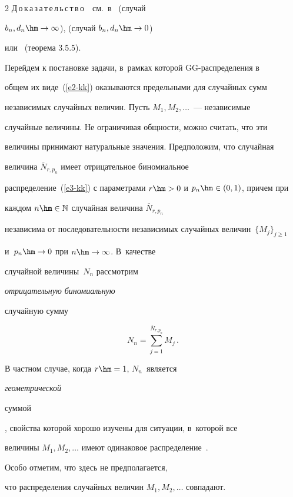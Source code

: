 \begin{multicols}{2}
Д\,о\,к\,а\,з\,а\,т\,е\,л\,ь\,с\,т\,в\,о\ \ см.~в~\cite{Korolev1994} (случай


$b_n,d_n\hm\to\infty$), \cite{Korolev1995} (случай $b_n,d_n\hm\to 0$) 


или~\cite{BeningKorolev2002} (теорема 3.5.5).





\smallskip





Перейдем к постановке задачи, в~рамках которой GG-распределения в


общем их виде~(\ref{e2-kk}) оказываются предельными для случайных сумм


независи\-мых случайных величин. Пусть $M_1,M_2,\ldots$~--- независимые


случайные величины. Не ограничивая общности, можно считать, что эти


величины принимают натуральные значения. Предположим, что случайная


величина $\overline N_{r,p_n}$ имеет отрицательное биномиальное


распределение~(\ref{e3-kk}) с параметрами $r\hm>0$ и $p_n\hm\in(0,1)$, причем при


каж\-дом $n\hm\in\mathbb{N}$ случайная величина $\overline N_{r,p_n}$


независима от последовательности независимых случайных величин~$\{M_j\}_{j\geqslant1}$ 


и~$p_n\hm\to 0$ при $n\hm\to\infty$. В~качестве


случайной величины~$N_n$ рассмотрим {\it отрицательную биномиальную


случайную сумму}


\begin{equation}


N_n=\sum\limits_{j=1}^{\overline N_{r,p_n}}M_j\,.\label{e16-kk}


\end{equation}


В частном случае, когда $r\hm=1$, $N_n$~является {\it геометрической


суммой}, свойства которой хорошо изучены для ситуации, в~которой все


величины $M_1,M_2,\ldots$ имеют одинаковое распределение~\cite{Kalashnikov1997}. 


Особо отметим, что здесь не предполагается,


что распределения случайных величин $M_1,M_2,\ldots$ совпадают.



\end{multicols}
